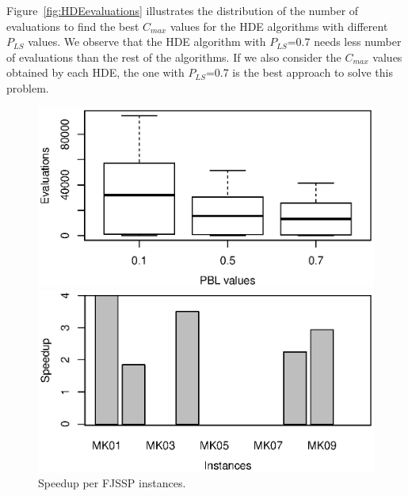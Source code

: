 
Figure~\ref{fig:HDEevaluations} illustrates the distribution of the number of evaluations to find the best $C_{max}$ values for the HDE algorithms with different $P_{LS}$ values. We observe that the HDE algorithm with $P_{LS}$=0.7 needs less number of evaluations than the rest of the algorithms. If we also consider the $C_{max}$ values obtained by each HDE, the one with $P_{LS}$=0.7 is the best approach to solve this problem.

\begin{figure}[!tb]
\scriptsize
\centering
\begin{minipage}[b]{0.4\linewidth}
    \centering
    \includegraphics[width=\linewidth]{figures/DELS-Evaluations.eps}
    \vspace{-0.9cm}
    \caption{Total number of evaluations for the HDE %
    .}
    \label{fig:HDEevaluations}
\end{minipage}  
\hspace{0.5cm}
\begin{minipage}[b]{0.4\linewidth}
\scriptsize
\centering
   \includegraphics[width=\linewidth]{figures/speedup.eps}
   \vspace{-0.9cm}
    \caption{Speedup per FJSSP instances.}
    \label{fig:speedup}
\end{minipage}
\end{figure}


